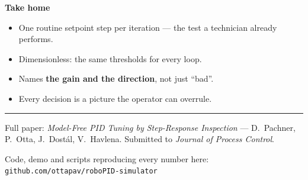 \documentclass[final]{article}
\renewcommand{\small}       {\fontsize{29}{36}\selectfont}
\renewcommand{\Large}       {\fontsize{40}{48}\selectfont}
\newcommand{\sffam}{\fontfamily{phv}\selectfont}
\newcommand{\coltitlebar}[1]{%
  \begin{tcolorbox}[enhanced, colback=navy, colframe=navy, boxrule=0pt,
                    arc=2mm, left=6mm, right=6mm, top=4mm, bottom=4mm,
                    before skip=0mm, after skip=6mm]
  \color{white}\sffam\bfseries\Large #1
  \end{tcolorbox}}
\newlength{\colw}
\begin{document}
\begin{minipage}[t]{\colw}
\coltitlebar{6 \; Take home}

\begin{panelbox}{}
\vspace{-5mm}
\begin{itemize}
\item One routine setpoint step per iteration --- the test a technician
      already performs.
\item Dimensionless: the same thresholds for every loop.
\item Names \textbf{the gain and the direction}, not just ``bad''.
\item Every decision is a picture the operator can overrule.
\end{itemize}

\vspace{3mm}
\end{panelbox}

\end{minipage}

\vspace{4mm}
{\color{rule}\rule{\textwidth}{1.6pt}}
\vspace{0.5mm}

\noindent
\begin{minipage}[c]{0.63\textwidth}
{\small\color{muted}Full paper: \emph{Model-Free PID Tuning by Step-Response Inspection} --- D.~Pachner, P.~Otta,
J.~Dost\'al, V.~Havlena. Submitted to \emph{Journal of Process
Control}.}
\end{minipage}\hfill
\begin{minipage}[c]{0.33\textwidth}
\raggedleft
{\small\color{muted}Code, demo and scripts reproducing every number here:
\texttt{github.com/ottapav/roboPID-simulator}}
\end{minipage}
\end{document}
